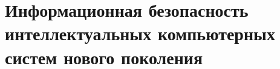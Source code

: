 \chapter{Информационная безопасность интеллектуальных компьютерных систем нового поколения}
\label{chapter_security}


%